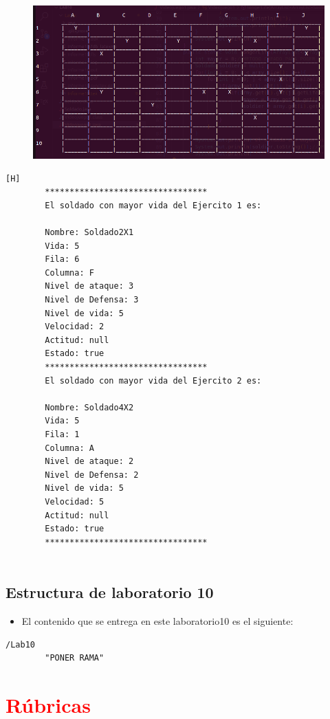 \documentclass{article}
\begin{document}
	\begin{figure}[H]
		\centering
		\includegraphics[width=1.0\textwidth,keepaspectratio]{img/Commit4.png}
	\end{figure}
	\begin{lstlisting}[language=bash,caption={Ejecucion:}][H]
		*********************************
		El soldado con mayor vida del Ejercito 1 es: 
		
		Nombre: Soldado2X1
		Vida: 5
		Fila: 6
		Columna: F
		Nivel de ataque: 3
		Nivel de Defensa: 3
		Nivel de vida: 5
		Velocidad: 2
		Actitud: null
		Estado: true
		*********************************
		El soldado con mayor vida del Ejercito 2 es: 
		
		Nombre: Soldado4X2
		Vida: 5
		Fila: 1
		Columna: A
		Nivel de ataque: 2
		Nivel de Defensa: 2
		Nivel de vida: 5
		Velocidad: 5
		Actitud: null
		Estado: true
		*********************************
		
	\end{lstlisting}
	\subsection{Estructura de laboratorio 10}
	\begin{itemize}	
		\item El contenido que se entrega en este laboratorio10 es el siguiente:
	\end{itemize}
	\begin{lstlisting}[style=ascii-tree]
	/Lab10	
		"PONER RAMA"

	\end{lstlisting}    
	\section{\textcolor{red}{Rúbricas}}
	
\end{document}
